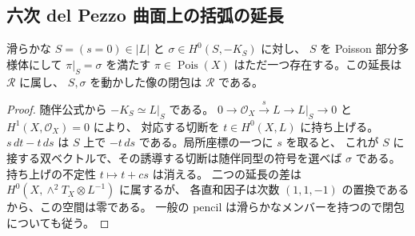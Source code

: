 \subsection{六次 del Pezzo 曲面上の括弧の延長}
\begin{proposition}\label{cube:prop:delpezzo}
滑らかな $S=(s=0)\in|L|$ と $\sigma\in H^0(S,-K_S)$ に対し、
$S$ を Poisson 部分多様体にして $\pi|_S=\sigma$ を満たす
$\pi\in\operatorname{Pois}(X)$ はただ一つ存在する。この延長は $\mathcal R$ に属し、
$S,\sigma$ を動かした像の閉包は $\mathcal R$ である。
\end{proposition}
\begin{proof}
随伴公式から $-K_S\simeq L|_S$ である。
$0\to\mathcal O_X\xrightarrow{s}L\to L|_S\to0$ と $H^1(X,\mathcal O_X)=0$ により、
対応する切断を $t\in H^0(X,L)$ に持ち上げる。$s\,dt-t\,ds$ は
$S$ 上で $-t\,ds$ である。局所座標の一つに $s$ を取ると、
これが $S$ に接する双ベクトルで、その誘導する切断は随伴同型の符号を選べば
$\sigma$ である。持ち上げの不定性 $t\mapsto t+cs$ は消える。
二つの延長の差は $H^0(X,\wedge^2 T_X\otimes L^{-1})$ に属するが、
各直和因子は次数 $(1,1,-1)$ の置換であるから、この空間は零である。
一般の pencil は滑らかなメンバーを持つので閉包についても従う。
\end{proof}

